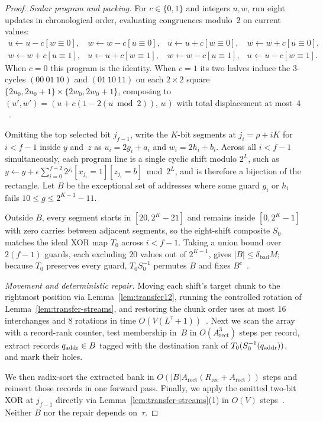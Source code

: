 \begin{proof}
\emph{Scalar program and packing.}
For $c\in\{0,1\}$ and integers $u,w$, run eight updates in chronological order, evaluating congruences modulo~$2$ on current values:
\[
\begin{array}{llll}
u\leftarrow u-c[w\equiv0], & w\leftarrow w-c[u\equiv0], & u\leftarrow u+c[w\equiv0], & w\leftarrow w+c[u\equiv0],\\
w\leftarrow w+c[u\equiv1], & u\leftarrow u+c[w\equiv1], & w\leftarrow w-c[u\equiv1], & u\leftarrow u-c[w\equiv1].
\end{array}
\]
When $c=0$ this program is the identity. When $c=1$ its two halves induce the $3$-cycles $(00\ 01\ 10)$ and $(01\ 10\ 11)$ on each $2\times2$ square $\{2u_0,2u_0+1\}\times\{2w_0,2w_0+1\}$, composing to $(u',w')=(u+c(1-2(u\bmod2)),\,w)$ with total displacement at most~$4$~\cite[proof of Lemma~13, (20)--(21)]{OAI26}.

Omitting the top selected bit $j_{f-1}$, write the $K$-bit segments at $j_i=\rho+iK$ for $i<f-1$ inside $y$ and~$z$ as $u_i=2g_i+a_i$ and $w_i=2h_i+b_i$. Across all $i<f-1$ simultaneously, each program line is a single cyclic shift modulo $2^L$, such as $y\leftarrow y+\epsilon\sum_{i=0}^{f-2}2^{j_i}[x_{j_i}=1][z_{j_i}=b]\bmod2^L$, and is therefore a bijection of the rectangle. Let $B$ be the exceptional set of addresses where some guard $g_i$ or $h_i$ fails $10\le g\le2^{K-1}-11$.

Outside $B$, every segment starts in $[20,2^K-21]$ and remains inside $[0,2^K-1]$ with zero carries between adjacent segments, so the eight-shift composite $S_0$ matches the ideal XOR map $T_0$ across $i<f-1$. Taking a union bound over $2(f-1)$ guards, each excluding $20$ values out of $2^{K-1}$, gives $|B|\le\delta_{\mathrm{bad}}M$; because $T_0$ preserves every guard, $T_0S_0^{-1}$ permutes $B$ and fixes $B^c$~\cite[proof of Lemma~13, (22)--(24)]{OAI26}.

\emph{Movement and deterministic repair.}
Moving each shift's target chunk to the rightmost position via Lemma~\ref{lem:transfer12}, running the controlled rotation of Lemma~\ref{lem:transfer-streams}, and restoring the chunk order uses at most $16$ interchanges and $8$ rotations in time $O(V(L^\tau+1))$~\cite[proof of Lemma~13, pp.~30--31]{OAI26}. Next we scan the array with a record-rank counter, test membership in~$B$ in $O(A_{\mathrm{rect}}^3)$ steps per record, extract records $q_{\rm addr}\in B$ tagged with the destination rank of $T_0(S_0^{-1}(q_{\rm addr}))$, and mark their holes.

We then radix-sort the extracted bank in $O(|B|A_{\mathrm{rect}}(R_{\mathrm{rec}}+A_{\mathrm{rect}}))$ steps and reinsert those records in one forward pass. Finally, we apply the omitted two-bit XOR at $j_{f-1}$ directly via Lemma~\ref{lem:transfer-streams}(1) in $O(V)$ steps~\cite[proof of Lemma~13, (19), p.~31]{OAI26}. Neither $B$ nor the repair depends on~$\tau$.
\end{proof}

